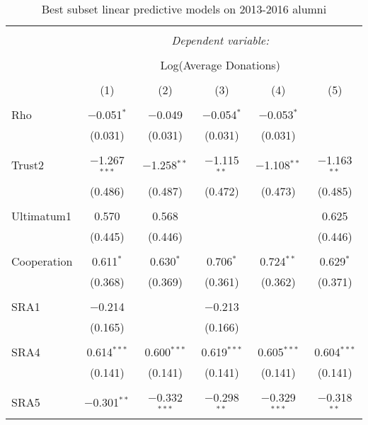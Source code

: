 \newpage

\begin{table}[!htbp] \centering 
  \caption{Best subset linear predictive models on 2013-2016 alumni} 
  \label{} 
      \begin{adjustbox}{width=\textwidth}
\begin{tabular}{@{\extracolsep{5pt}}lccccc} 
\\[-1.8ex]\hline 
\hline \\[-1.8ex] 
 & \multicolumn{5}{c}{\textit{Dependent variable:}} \\ 
\cline{2-6} 
\\[-1.8ex] & \multicolumn{5}{c}{Log(Average Donations)} \\ 
\\[-1.8ex] & (1) & (2) & (3) & (4) & (5)\\ 
\hline \\[-1.8ex] 
 Rho & $-$0.051$^{*}$ & $-$0.049 & $-$0.054$^{*}$ & $-$0.053$^{*}$ &  \\ 
  & (0.031) & (0.031) & (0.031) & (0.031) &  \\ 
  & & & & & \\ 
 Trust2 & $-$1.267$^{***}$ & $-$1.258$^{**}$ & $-$1.115$^{**}$ & $-$1.108$^{**}$ & $-$1.163$^{**}$ \\ 
  & (0.486) & (0.487) & (0.472) & (0.473) & (0.485) \\ 
  & & & & & \\ 
 Ultimatum1 & 0.570 & 0.568 &  &  & 0.625 \\ 
  & (0.445) & (0.446) &  &  & (0.446) \\ 
  & & & & & \\ 
 Cooperation & 0.611$^{*}$ & 0.630$^{*}$ & 0.706$^{*}$ & 0.724$^{**}$ & 0.629$^{*}$ \\ 
  & (0.368) & (0.369) & (0.361) & (0.362) & (0.371) \\ 
  & & & & & \\ 
 SRA1 & $-$0.214 &  & $-$0.213 &  &  \\ 
  & (0.165) &  & (0.166) &  &  \\ 
  & & & & & \\ 
 SRA4 & 0.614$^{***}$ & 0.600$^{***}$ & 0.619$^{***}$ & 0.605$^{***}$ & 0.604$^{***}$ \\ 
  & (0.141) & (0.141) & (0.141) & (0.141) & (0.141) \\ 
  & & & & & \\ 
 SRA5 & $-$0.301$^{**}$ & $-$0.332$^{***}$ & $-$0.298$^{**}$ & $-$0.329$^{***}$ & $-$0.318$^{**}$ \\ 

\end{tabular}
\end{adjustbox}
\end{table}

